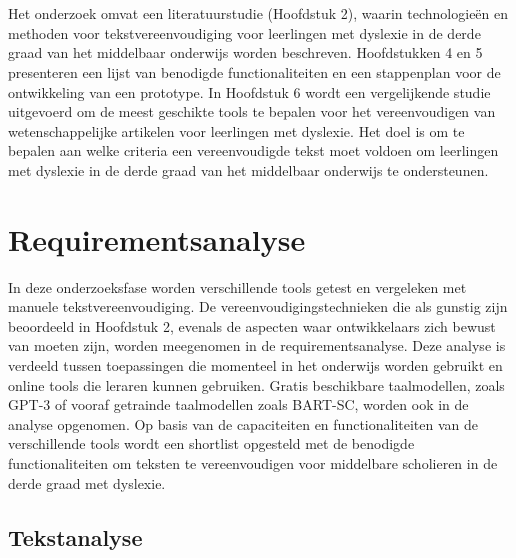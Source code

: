 
\chapter{}%
\label{ch:methodologie}

Het onderzoek omvat een literatuurstudie (Hoofdstuk 2), waarin technologieën en methoden voor tekstvereenvoudiging voor leerlingen met dyslexie in de derde graad van het middelbaar onderwijs worden beschreven. Hoofdstukken 4 en 5 presenteren een lijst van benodigde functionaliteiten en een stappenplan voor de ontwikkeling van een prototype. In Hoofdstuk 6 wordt een vergelijkende studie uitgevoerd om de meest geschikte tools te bepalen voor het vereenvoudigen van wetenschappelijke artikelen voor leerlingen met dyslexie. Het doel is om te bepalen aan welke criteria een vereenvoudigde tekst moet voldoen om leerlingen met dyslexie in de derde graad van het middelbaar onderwijs te ondersteunen.

\chapter{Requirementsanalyse}

In deze onderzoeksfase worden verschillende tools getest en vergeleken met manuele tekstvereenvoudiging. De vereenvoudigingstechnieken die als gunstig zijn beoordeeld in Hoofdstuk 2, evenals de aspecten waar ontwikkelaars zich bewust van moeten zijn, worden meegenomen in de requirementsanalyse. Deze analyse is verdeeld tussen toepassingen die momenteel in het onderwijs worden gebruikt en online tools die leraren kunnen gebruiken. Gratis beschikbare taalmodellen, zoals GPT-3 of vooraf getrainde taalmodellen zoals BART-SC, worden ook in de analyse opgenomen. Op basis van de capaciteiten en functionaliteiten van de verschillende tools wordt een shortlist opgesteld met de benodigde functionaliteiten om teksten te vereenvoudigen voor middelbare scholieren in de derde graad met dyslexie.

\section{Tekstanalyse}

